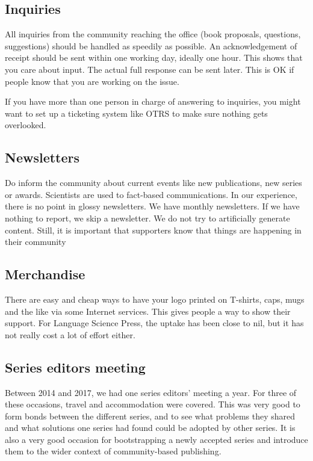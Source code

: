 \documentclass[guidelines,nonflat,modfonts] {langsci/langscibook}
\begin{document}
\subsection{Inquiries}
All inquiries from the community reaching the office (book proposals, questions, suggestions) should be handled as speedily as possible. An acknowledgement of receipt should be sent within one working day, ideally one hour. This shows that you care about input. The actual full response can be sent later. This is OK if people know that you are working on the issue.


If you have more than one person in charge of answering to inquiries, you might want to set up a ticketing system like OTRS to make sure nothing gets overlooked. 

\subsection{Newsletters}
Do inform the community about current events like new publications, new series or awards. Scientists are used to fact-based communications. In our experience, there is no point in glossy newsletters. We have monthly newsletters. If we have nothing to report, we skip a newsletter. We do not try to artificially generate content. Still, it is important that supporters know that things are happening in their community %


\subsection{Merchandise}
There are easy and cheap ways to have your logo printed on T-shirts, caps, mugs and the like via some Internet services. This gives people a way to show their support. For Language Science Press, the uptake has been close to nil, but it has not really cost a lot of effort either. 

\subsection{Series editors meeting}  
Between 2014 and 2017, we had one series editors' meeting a year. For three of these occasions, travel and accommodation were covered. This was very good to form bonds between the different series, and to see what problems they shared and what solutions one series had found could be adopted by other series. It is also a very good occasion for bootstrapping a newly accepted series and introduce them to the wider context of community-based publishing. 
\end{document}
